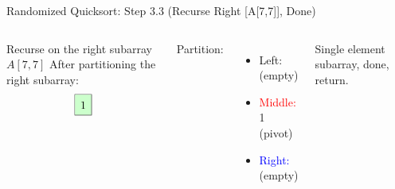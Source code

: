 \begin{frame}{Randomized Quicksort: Step 3.3 (Recurse Right [A[7,7]], Done)}
  \begin{columns}[t]
    Recurse on the right subarray $A[7,7]$
    After partitioning the right subarray:
    \[
      \renewcommand{\arraystretch}{1.5}
      \begin{array}{|c|c|c|}
        \hline
        \cellcolor{green!20}{1} \\
        \hline
      \end{array}
    \]

    Partition:
    \begin{itemize}
      \item \textcolor{green!60!black}{Left:} (empty)
      \item \textcolor{red}{Middle:} 1 (pivot)
      \item \textcolor{blue}{Right:} (empty)
    \end{itemize}
    Single element subarray, done, return.
    \begin{minipage}[t]{\linewidth}
      \vspace{0pt} %
      \begin{center}


\end{center}
\end{minipage}
\end{columns}
\end{frame}

